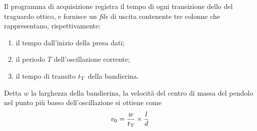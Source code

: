 \documentclass{lab1-article}
\begin{document}
\begin{article}
\secconsiderations

\subsecdataformat

Il programma di acquisizione registra il tempo di ogni transizione
dello del traguardo ottico, e fornisce un \emph{file} di uscita contenente tre
colonne che rappresentano, rispettivamente:
\begin{enumerate}
\item il tempo dall'inizio della presa dati;
\item il periodo $T$ dell'oscillazione corrente;
\item il tempo di transito $t_{\rm T}$ della bandierina.
\end{enumerate}

Detta $w$ la larghezza della bandierina, la velocit\`a del centro di massa del
pendolo nel punto pi\`u basso dell'oscillazione si ottiene come
\begin{align}
  v_0 = \frac{w}{t_{\rm T}} \times \frac{l}{d}
\end{align}


\onecolumn


\plasduinosave


\end{article}
\end{document}

